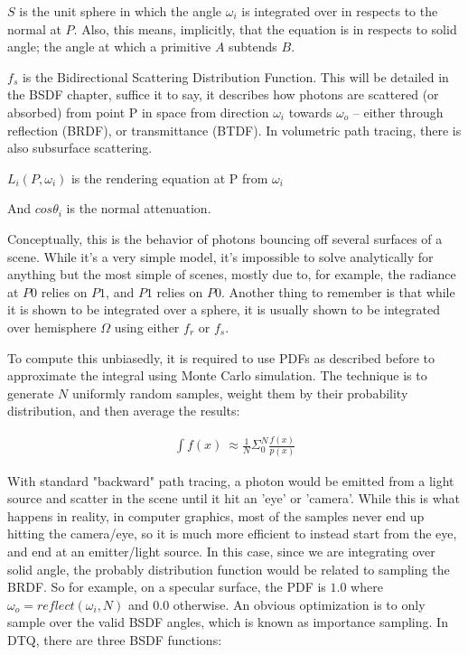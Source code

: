 \documentclass{article}
\begin{document}
  	 
  	 $S$ is the unit sphere in which the angle $\omega_i$ is integrated over in respects to the normal at $P$. Also, this means, implicitly, that the equation is in respects to solid angle; the angle at which a primitive $A$ subtends $B$.
  	 
  	 $f_s$ is the Bidirectional Scattering Distribution Function. This will be detailed in the BSDF chapter, suffice it to say, it describes how photons are scattered (or absorbed) from point P in space from direction $\omega_i$ towards $\omega_o$ -- either through reflection (BRDF), or transmittance (BTDF). In volumetric path tracing, there is also subsurface scattering.
  	 
  	 $L_i(P, \omega_i)$ is the rendering equation at P from $\omega_i$
  	 
  	 And $cos\theta_i$ is the normal attenuation.
  	 
  Conceptually, this is the behavior of photons bouncing off several surfaces of a scene. While it's a very simple model, it's impossible to solve analytically for anything but the most simple of scenes, mostly due to, for example, the radiance at $P0$ relies on $P1$, and $P1$ relies on $P0$. Another thing to remember is that while it is shown to be integrated over a sphere, it is usually shown to be integrated over hemisphere $\Omega$ using either $f_r$ or $f_s$.
  
  To compute this unbiasedly, it is required to use PDFs as described before to approximate the integral using Monte Carlo simulation. The technique is to generate $N$ uniformly random samples, weight them by their probability distribution, and then average the results:
  
  \begin{align}
   \int{f(x)} \: \approx \frac{1}{N}\Sigma_0^N{\frac{f(x)}{p(x)}}
  \end{align}
  
  With standard "backward" path tracing, a photon would be emitted from a light source and scatter in the scene until it hit an 'eye' or 'camera'. While this is what happens in reality, in computer graphics, most of the samples never end up hitting the camera/eye, so it is much more efficient to instead start from the eye, and end at an emitter/light source. In this case, since we are integrating over solid angle, the probably distribution function would be related to sampling the BRDF. So for example, on a specular surface, the PDF is $1.0$ where $\omega_o = reflect(\omega_i, N)$ and $0.0$ otherwise. An obvious optimization is to only sample over the valid BSDF angles, which is known as importance sampling. In DTQ, there are three BSDF functions:
  
\end{document}
